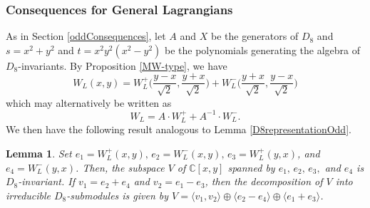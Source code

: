 \documentclass[a4paper,reqno]{amsart}
\newtheorem{lemma}[theorem]{Lemma}
\theoremstyle{definition}
\theoremstyle{remark} \newtheorem{remark}[theorem]{Remark}
\numberwithin{equation}{section}
\begin{document}
\subsubsection{Consequences for General Lagrangians}As in Section \ref{oddConsequences}, let \(A\) and \(X\) be the generators of \(D_8\) and \(s = x^2+y^2\) and \(t = x^2y^2(x^2-y^2)\) be the polynomials generating the algebra of \(D_8\)-invariants. By Proposition \ref{MW-type}, we have
\begin{equation}\label{MW-typeEvenI}
    W_L(x,y) = W_L^+\biggl(\frac{y-x}{\sqrt{2}}, \frac{y+x}{\sqrt{2}}\biggr) + W_L^-\biggl(\frac{y+x}{\sqrt{2}},\frac{y-x}{\sqrt{2}}\biggr)
\end{equation}
which may alternatively be written as 
\begin{equation}\label{MW-typeEven}
    W_L = A \cdot W_L^+ + A^{-1} \cdot W_L^-. 
\end{equation}
We then have the following result analogous to Lemma \ref{D8representationOdd}.

\begin{lemma}\label{D8representationEven}
    Set \(e_1 = W_L^+(x,y),\, e_2 = W_L^-(x,y),\, e_3 = W_L^+(y,x)\), and \(e_4 = W_L^-(y,x)\). Then, the subspace \(V\) of \(\mathbb{C}[x,y]\) spanned by \(e_1,\, e_2,\, e_3,\) and \(e_4\) is \(D_8\)-invariant. If \(v_1 = e_2+e_4\) and \(v_2 = e_1-e_3\), then the decomposition of \(V\) into irreducible \(D_8\)-submodules is given by \(V = \langle v_1, v_2 \rangle \oplus \langle e_2 - e_4 \rangle \oplus \langle e_1 + e_3 \rangle\).
\end{lemma}
\end{document}
